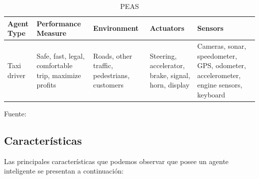 \begin{table}[ht!]
\centering
\caption{PEAS} \vskip 0.1cm
\begin{tabular}{|p{2.5cm} ||p{3cm} |p{2.9cm} |p{2.8cm} |p{3.3cm}|}  \hline 
\bf Agent Type & \bf Performance Measure & \bf Environment & \bf Actuators & \bf Sensors \\ \hline 
Taxi driver & Safe, fast, legal, comfortable trip, maximize profits & Roads, other traffic, pedestrians, customers & Steering, accelerator, brake, signal, horn, display & Cameras, sonar, speedometer, GPS, odometer, accelerometer, engine sensors, keyboard \\ \hline
\end{tabular} 
\begin{center}
{\small{Fuente: \cite{Russel}}}
\end{center}
\end{table}

\subsection{Características}
Las principales características que podemos observar que  posee un agente inteligente se presentan a continuación:

